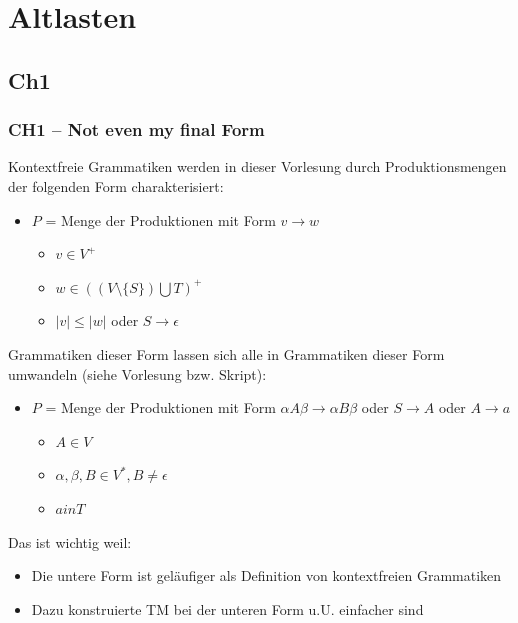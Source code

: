 



\section{Altlasten}
\subsection{Ch1}
\begin{frame}
	\frametitle{CH1 -- Not even my final Form}
	Kontextfreie Grammatiken werden in dieser Vorlesung durch Produktionsmengen der folgenden Form charakterisiert:
\begin{itemize}
	\item $P$ = Menge der Produktionen mit Form $v \rightarrow w$
	\begin{itemize}
		\item $v \in V^{+}$
		\item $w \in ((V \setminus \{S\}) \bigcup T)^{+}$
		\item $|v| \leq |w|$ oder $S \rightarrow \epsilon$
	\end{itemize}
\end{itemize}
Grammatiken dieser Form lassen sich alle in Grammatiken dieser Form umwandeln (siehe Vorlesung bzw. Skript):
\begin{itemize}
	\item $P$ = Menge der Produktionen mit Form $\alpha A \beta \rightarrow \alpha B \beta$ oder $S \rightarrow A$ oder $A \rightarrow a$
	\begin{itemize}
		\item $A \in V$
		\item $\alpha, \beta, B \in V^{*}, B \neq \epsilon$
		\item $a in T$
	\end{itemize}
\end{itemize}
Das ist wichtig weil:
\begin{itemize}
	\item Die untere Form ist geläufiger als Definition von kontextfreien Grammatiken
	\item Dazu konstruierte TM bei der unteren Form u.U. einfacher sind
\end{itemize}
\end{frame}

